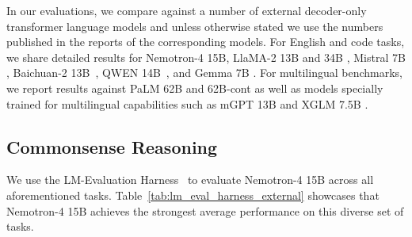 \documentclass[11pt]{article}
\newcommand{\ours}{Nemotron-4}
\begin{document}


In our evaluations, we compare against a number of external decoder-only transformer language models and unless otherwise stated we use the numbers published in the reports of the corresponding models. For English and code tasks, we share detailed results for \ours{} 15B, LlaMA-2 13B and 34B \citep{touvron2023llama2}, Mistral 7B \citep{jiang2023mistral}, Baichuan-2 13B~\citep{yang2023baichuan}, QWEN 14B~\citep{bai2023qwen}, and Gemma 7B \citep{gemma24}. For multilingual benchmarks, we report results against PaLM 62B and 62B-cont \citep{chowdhery2022palm} as well as models specially trained for multilingual capabilities such as mGPT 13B \citep{shliazhko2022mgpt} and XGLM 7.5B \citep{lin2022fewshot}.



\subsection{Commonsense Reasoning}
We use the LM-Evaluation Harness~\citep{eval-harness} to evaluate \ours{} 15B across all aforementioned tasks. Table~\ref{tab:lm_eval_harness_external} showcases that \ours{} 15B achieves the strongest average performance on this diverse set of tasks.
\end{document}
